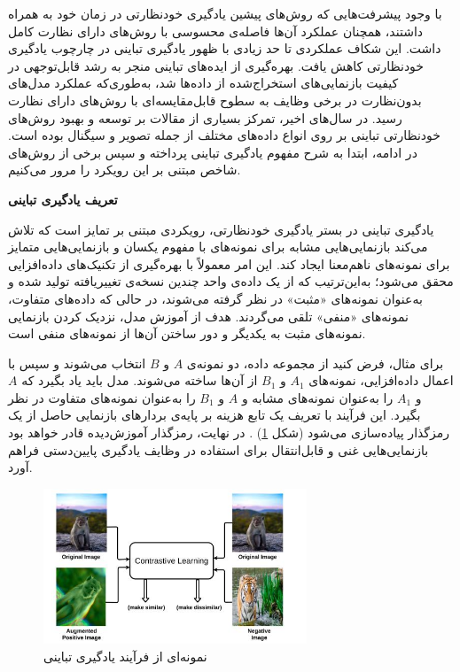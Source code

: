 با وجود پیشرفت‌هایی که روش‌های پیشین یادگیری خودنظارتی در زمان خود به همراه داشتند، همچنان عملکرد آن‌ها فاصله‌ی محسوسی با روش‌های دارای نظارت کامل داشت. این شکاف عملکردی تا حد زیادی با ظهور یادگیری تباینی در چارچوب یادگیری خودنظارتی کاهش یافت. بهره‌گیری از ایده‌های تباینی منجر به رشد قابل‌توجهی در کیفیت بازنمایی‌های استخراج‌شده از داده‌ها شد، به‌طوری‌که عملکرد مدل‌های بدون‌نظارت در برخی وظایف به سطوح قابل‌مقایسه‌ای با روش‌های دارای نظارت رسید. در سال‌های اخیر، تمرکز بسیاری از مقالات بر توسعه و بهبود روش‌های خودنظارتی تباینی بر روی انواع داده‌های مختلف از جمله تصویر و سیگنال بوده است. در ادامه، ابتدا به شرح مفهوم یادگیری تباینی پرداخته و سپس برخی از روش‌های شاخص مبتنی بر این رویکرد را مرور می‌کنیم.\newline

\noindent\textbf{تعریف یادگیری تباینی}

یادگیری تباینی در بستر یادگیری خودنظارتی، رویکردی مبتنی بر تمایز است که تلاش می‌کند بازنمایی‌هایی مشابه برای نمونه‌های با مفهوم یکسان و بازنمایی‌هایی متمایز برای نمونه‌های ناهم‌معنا ایجاد کند. این امر معمولاً با بهره‌گیری از تکنیک‌های داده‌افزایی محقق می‌شود؛ به‌این‌ترتیب که از یک داده‌ی واحد چندین نسخه‌ی تغییریافته تولید شده و به‌عنوان نمونه‌های «مثبت» در نظر گرفته می‌شوند، در حالی که داده‌های متفاوت، نمونه‌های «منفی» تلقی می‌گردند. هدف از آموزش مدل، نزدیک کردن بازنمایی نمونه‌های مثبت به یکدیگر و دور ساختن آن‌ها از نمونه‌های منفی است.

برای مثال، فرض کنید از مجموعه داده، دو نمونه‌ی $A$ و $B$ انتخاب می‌شوند و سپس با اعمال داده‌افزایی، نمونه‌های $A_1$ و $B_1$ از آن‌ها ساخته می‌شوند. مدل باید یاد بگیرد که $A$ و $A_1$ را به‌عنوان نمونه‌های مشابه و $A$ و $B_1$ را به‌عنوان نمونه‌های متفاوت در نظر بگیرد. این فرآیند با تعریف یک تابع هزینه بر پایه‌ی بردارهای بازنمایی حاصل از یک رمزگذار پیاده‌سازی می‌شود (شکل \ref{fig:contrastive}) \cite{jaiswal2020survey}. در نهایت، رمزگذار آموزش‌دیده قادر خواهد بود بازنمایی‌هایی غنی و قابل‌انتقال برای استفاده در وظایف یادگیری پایین‌دستی فراهم آورد.

\begin{figure}[htb!]
\centering
\includegraphics[width=0.7\textwidth]{Images/Chapter2/contrastive.png}
\caption{نمونه‌ای از فرآیند یادگیری تباینی}
\label{fig:contrastive}
\end{figure}

